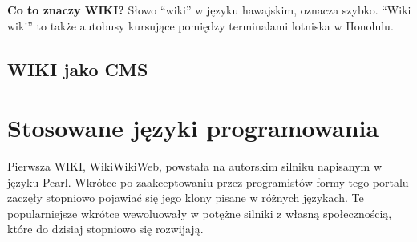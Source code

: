 \documentclass{article}
\begin{document}
	\textbf{Co to znaczy WIKI?}
		Słowo ``wiki'' w języku hawajskim, oznacza szybko. ``Wiki wiki'' to także autobusy kursujące pomiędzy terminalami lotniska w Honolulu.

% 

	\subsection{WIKI jako CMS}


			
	

\newpage
\section{Stosowane języki programowania}
Pierwsza WIKI, WikiWikiWeb, powstała na autorskim silniku napisanym w języku Pearl. Wkrótce po zaakceptowaniu przez programistów formy tego portalu zaczęły stopniowo pojawiać się jego klony pisane w różnych językach. Te popularniejsze wkrótce wewoluowały w potężne silniki z własną społecznością, które do dzisiaj stopniowo się rozwijają. 
\end{document}
